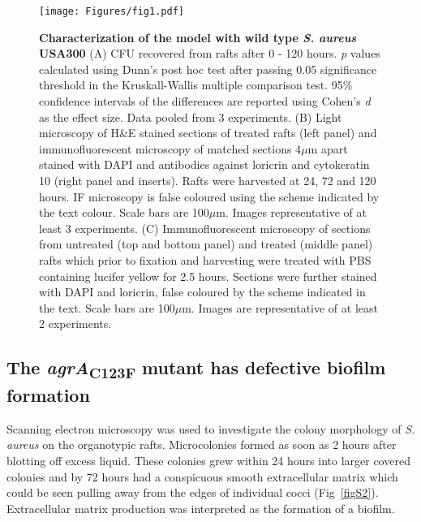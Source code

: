 \documentclass[10pt,letterpaper]{article}
\begin{document}

\begin{figure}[!ht]
\begin{adjustwidth}{-2.25in}{0in}
\texttt{[image: Figures/fig1.pdf]}
\caption[Characterization of the model with wild type \textit{S. aureus} USA300]{
	\textbf{Characterization of the model with wild type \textit{S. aureus} USA300}
	(A) CFU recovered from rafts after 0 - 120 hours. \textit{p} values calculated using Dunn's post hoc test after passing 0.05 significance threshold in the Kruskall-Wallis multiple comparison test. 95\% confidence intervals of the differences are reported using Cohen's \textit{d} as the effect size. Data pooled from 3 experiments.
	(B) Light microscopy of H\&E stained sections of treated rafts (left panel) and immunofluorescent microscopy of matched sections 4$\mu$m apart stained with DAPI and antibodies against loricrin and cytokeratin 10 (right panel and inserts). Rafts were harvested at 24, 72 and 120 hours. IF microscopy is false coloured using the scheme indicated by the text colour. Scale bars are 100$\mu$m. Images representative of at least 3 experiments.
	(C) Immunofluorescent microscopy of sections from untreated (top and bottom panel) and treated (middle panel) rafts which prior to fixation and harvesting were treated with PBS containing lucifer yellow for 2.5 hours. Sections were further stained with DAPI and loricrin, false coloured by the scheme indicated in the text. Scale bars are 100$\mu$m. Images are representative of at least 2 experiments.}
    \label{fig1}
    \end{adjustwidth}
\end{figure}

\subsection*{The \textit{agrA}\textsubscript{C123F} mutant has defective biofilm formation}

Scanning electron microscopy was used to investigate the colony morphology of \textit{S. aureus} on the organotypic rafts.
Microcolonies formed as soon as 2 hours after blotting off excess liquid.
These colonies grew within 24 hours into larger covered colonies and by 72 hours had a conspicuous smooth extracellular matrix which could be seen pulling away from the edges of individual cocci (Fig~\ref{figS2}).
Extracellular matrix production was interpreted as the formation of a biofilm.
\end{document}
